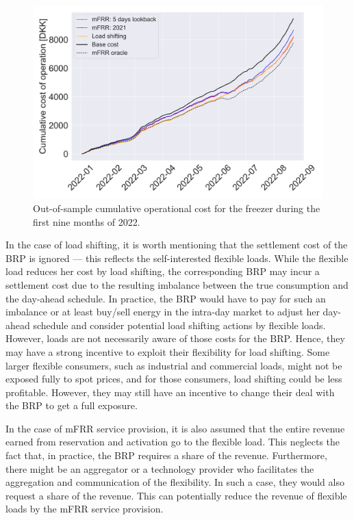 \begin{figure}[t]
    \centering
    \includegraphics[width=\columnwidth]{../figures/cumulative_cost_comparison.png}
    \caption{Out-of-sample cumulative operational cost for the freezer during the first nine months of 2022.}
    \label{fig:cumulative_cost_comparison}
        \vspace{-2mm}
        \end{figure}

In the case of load shifting, it is worth mentioning that the settlement cost of the BRP is ignored --- this reflects the self-interested flexible loads.  While the flexible load reduces her cost by load shifting, the corresponding BRP may incur a settlement cost due to the resulting imbalance between the true consumption and the day-ahead schedule. In practice, the BRP would have to pay for such an imbalance or at least buy/sell energy in the intra-day market to adjust her day-ahead schedule and consider potential load shifting actions by flexible loads. However, loads are not necessarily aware of those costs for the BRP. Hence, they may have a strong incentive to exploit their flexibility for load shifting. Some larger flexible consumers, such as industrial and commercial loads, might not be exposed fully to spot prices, and for those consumers, load shifting could be less profitable. However, they may still have an incentive to change their deal with the BRP to get a full exposure.

In the case of mFRR service provision, it is also  assumed that the entire revenue earned from reservation and activation go to the flexible load. This neglects the fact that, in practice, the BRP requires a share of the revenue. Furthermore, there might be an aggregator or a technology provider who facilitates the aggregation and communication of the flexibility. In such a case, they would also request a share of the revenue. This can potentially reduce the revenue of flexible loads by the mFRR service provision.








